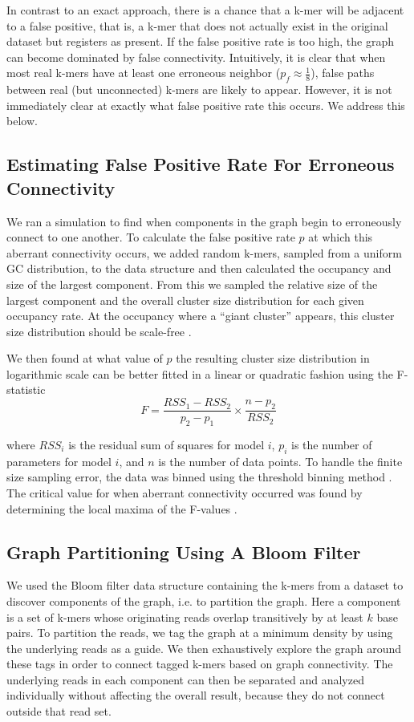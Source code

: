 \documentclass[12pt]{article} \usepackage{simplemargins}
\begin{document}
In contrast to an exact approach, there is a chance that a k-mer 
will be adjacent to a false positive,
that is, a k-mer
that does not actually exist in the original dataset but registers as present.
If the false positive rate is too high, the 
graph can become dominated by false connectivity. 
Intuitively, it is clear that when most real k-mers
have at least one erroneous neighbor ($p_f \approx \frac{1}{8}$), 
false paths between real (but unconnected) k-mers are likely to 
appear. However, it is not immediately clear at exactly what 
false positive rate this occurs. We address this below.  %

\subsection{Estimating False Positive Rate For Erroneous Connectivity}
We ran a simulation to find when components in the graph 
begin to erroneously connect to one another.
To calculate the false positive rate $p$ at which this aberrant 
connectivity occurs, 
we added random k-mers, sampled from a uniform GC distribution, to the data structure 
and then calculated the occupancy and size of 
the largest 
component. From this we sampled the relative size of 
the largest component and the overall cluster size distribution for each
given occupancy rate.
At the occupancy where a ``giant cluster'' appears, this cluster size distribution 
should be scale-free \cite{stauffer1979scaling}. 

We then found at what value of $p$ the resulting 
cluster size distribution in logarithmic 
scale can be better fitted in a linear or quadratic fashion using 
the F-statistic
\newline
\newline
\begin{displaymath}
F=\frac{RSS_1-RSS_2}{p_2-p_1} \times \frac{n - p_2}{RSS_2}
\end{displaymath}

where $RSS_i$ is the residual sum of squares for model $i$, $p_i$ is 
the number of parameters for model $i$, and $n$ is the number of data 
points. To handle the finite size sampling error, the data was binned using the 
threshold binning method \cite{adami2002critical}. The critical value for 
when aberrant connectivity occurred was found by determining the local maxima 
of the F-values \cite{wald43}.

\subsection{Graph Partitioning Using A Bloom Filter}
We used the Bloom filter data structure containing the k-mers from a
dataset to discover components of the graph, i.e. to
partition the graph.  Here a component is a set of k-mers
whose originating reads overlap transitively by at least $k$ base
pairs.  To partition the reads, we tag the graph at a minimum density
by using the underlying reads as a guide. We then exhaustively explore
the graph around these tags in order to connect tagged k-mers based on
graph connectivity.  The underlying reads in each component
can then be separated and analyzed individually without affecting the
overall result, because they do not connect outside that read set.
\end{document}
